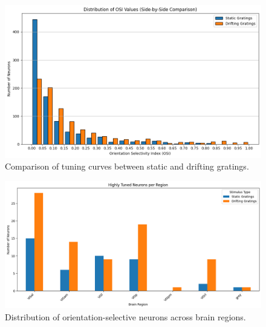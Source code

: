 \documentclass[10pt,twocolumn]{article}
\begin{document}
\begin{figure}[ht]
\centering
\includegraphics[width=\linewidth]{report_images/tuning_curves_comparison.png}
\caption{Comparison of tuning curves between static and drifting gratings.}
\label{fig:tuning_comparison}
\end{figure}

\begin{figure}[ht]
\centering
\includegraphics[width=\linewidth]{report_images/tuned_neurons_region.png}
\caption{Distribution of orientation-selective neurons across brain regions.}
\label{fig:tuned_regions}
\end{figure}
\end{document}
